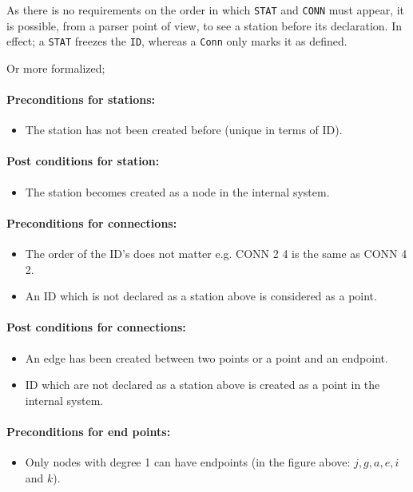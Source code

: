 \documentclass[10pt,a4paper]{article}
\def\Code#1{\texttt{#1}}
\begin{document}
As there is no requirements on the order in which \Code{STAT} and \Code{CONN} must appear, it is possible, from a parser point of view, to see a station before its declaration. In effect; a \Code{STAT} freezes the \Code{ID}, whereas a \Code{Conn} only marks it as defined.
 
Or more formalized;
\paragraph{Preconditions for stations:}
\begin{itemize}
  \item The station has not been created before (unique in terms of ID).
\end{itemize}

\paragraph{Post conditions for station:}
\begin{itemize}
\item The station becomes created as a node in the internal system.
\end{itemize} 

\paragraph{Preconditions for connections:}
\begin{itemize}
  \item The order of the ID’s does not matter e.g. CONN 2 4 is the same as CONN 4 2.
  \item An ID which is not declared as a station above is considered as a point.
\end{itemize}

\paragraph{Post conditions for connections:}
\begin{itemize}
  \item An edge has been created between two points or a point and an endpoint.
  \item ID which are not declared as a station above is created as a point in the internal system.
\end{itemize} 

\paragraph{Preconditions for end points:}
\begin{itemize}
  \item Only nodes with degree 1 can have endpoints (in the figure above: $j, g, a, e, i$ and $k$).
\end{itemize}
 
\end{document}
